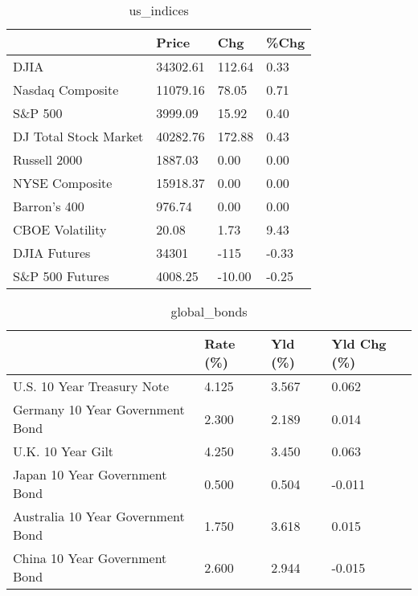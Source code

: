 \documentclass{article}%
\begin{document}
%


\begin{table}[htbp]%
\caption{us\_indices}%
\centering%
\begin{adjustbox}{width=1\textwidth}%
\begin{tabular}{llll}
\toprule
                      &    Price &    Chg &  \%Chg \\
\midrule
                 DJIA & 34302.61 & 112.64 &  0.33 \\
     Nasdaq Composite & 11079.16 &  78.05 &  0.71 \\
              S\&P 500 &  3999.09 &  15.92 &  0.40 \\
DJ Total Stock Market & 40282.76 & 172.88 &  0.43 \\
         Russell 2000 &  1887.03 &   0.00 &  0.00 \\
       NYSE Composite & 15918.37 &   0.00 &  0.00 \\
         Barron's 400 &   976.74 &   0.00 &  0.00 \\
      CBOE Volatility &    20.08 &   1.73 &  9.43 \\
         DJIA Futures &    34301 &   -115 & -0.33 \\
      S\&P 500 Futures &  4008.25 & -10.00 & -0.25 \\
\bottomrule
\end{tabular}
%
\end{adjustbox}%
\end{table}

%


\begin{table}[htbp]%
\caption{global\_bonds}%
\centering%
\begin{adjustbox}{width=1\textwidth}%
\begin{tabular}{llll}
\toprule
                                  & Rate (\%) & Yld (\%) & Yld Chg (\%) \\
\midrule
       U.S. 10 Year Treasury Note &    4.125 &   3.567 &       0.062 \\
  Germany 10 Year Government Bond &    2.300 &   2.189 &       0.014 \\
                U.K. 10 Year Gilt &    4.250 &   3.450 &       0.063 \\
    Japan 10 Year Government Bond &    0.500 &   0.504 &      -0.011 \\
Australia 10 Year Government Bond &    1.750 &   3.618 &       0.015 \\
    China 10 Year Government Bond &    2.600 &   2.944 &      -0.015 \\
\bottomrule
\end{tabular}
%
\end{adjustbox}%
\end{table}
\end{document}
